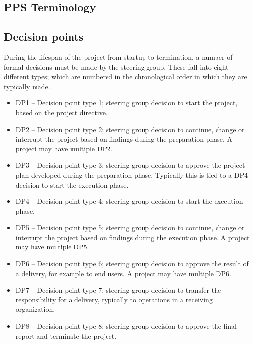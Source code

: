 \documentclass{article}
\begin{document}
\newpage
\begin{appendices}
\section{PPS Terminology}

\subsection{Decision points}
During the lifespan of the project from startup to termination, a number of formal decisions must be made by the steering group. These fall into eight different types; which are numbered in the chronological order in which they are typically made.
\begin{itemize}

\item DP1 – Decision point type 1; steering group decision to start the project, based on the project directive.

\item DP2 – Decision point type 2; steering group decision to continue, change or interrupt the project based on findings during the preparation phase. A project may have multiple DP2.

\item DP3 – Decision point type 3; steering group decision to approve the project plan developed during the preparation phase. Typically this is tied to a DP4 decision to start the execution phase.

\item DP4 – Decision point type 4; steering group decision to start the execution phase.

\item DP5 – Decision point type 5; steering group decision to continue, change or interrupt the project based on findings during the execution phase. A project may have multiple DP5.

\item DP6 – Decision point type 6; steering group decision to approve the result of a delivery, for example to end users. A project may have multiple DP6.

\item DP7 – Decision point type 7; steering group decision to transfer the responsibility for a delivery, typically to operations in a receiving organization.

\item DP8 – Decision point type 8; steering group decision to approve the final report and terminate the project.


\end{itemize}
\end{appendices}
\end{document}
